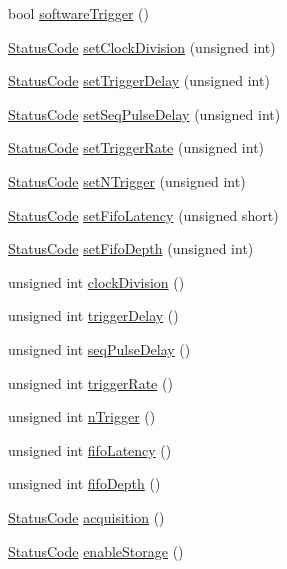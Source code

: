 \begin{DoxyCompactItemize}
\item 
bool \hyperlink{classA3PE_acb2ccd6b78b39a0a9e360439b3b6f4c7}{software\+Trigger} ()
\item 
\hyperlink{classStatusCode}{Status\+Code} \hyperlink{classA3PE_acf354b2c85a7e20f7f037beb278dd79d}{set\+Clock\+Division} (unsigned int)
\item 
\hyperlink{classStatusCode}{Status\+Code} \hyperlink{classA3PE_a6a63fc9503e0aa89ee9928fc7222ce0f}{set\+Trigger\+Delay} (unsigned int)
\item 
\hyperlink{classStatusCode}{Status\+Code} \hyperlink{classA3PE_af34831e9776a000f833a610ea999a564}{set\+Seq\+Pulse\+Delay} (unsigned int)
\item 
\hyperlink{classStatusCode}{Status\+Code} \hyperlink{classA3PE_a1ae8e5a69e17d6b3157779544fa14c75}{set\+Trigger\+Rate} (unsigned int)
\item 
\hyperlink{classStatusCode}{Status\+Code} \hyperlink{classA3PE_a81db44ddfc42b67ed08756b113b8e122}{set\+N\+Trigger} (unsigned int)
\item 
\hyperlink{classStatusCode}{Status\+Code} \hyperlink{classA3PE_a969469569005dfb130aca674de5dacff}{set\+Fifo\+Latency} (unsigned short)
\item 
\hyperlink{classStatusCode}{Status\+Code} \hyperlink{classA3PE_a4d8f78a1b09b409f288b34d503c71146}{set\+Fifo\+Depth} (unsigned int)
\item 
unsigned int \hyperlink{classA3PE_a81e32c82ca14f85fd7f26cd9a54f7a38}{clock\+Division} ()
\item 
unsigned int \hyperlink{classA3PE_ac0aabc1457923b7ee7da0a2c91c46451}{trigger\+Delay} ()
\item 
unsigned int \hyperlink{classA3PE_acce23c9abd4f434c8c5965351f5ceef0}{seq\+Pulse\+Delay} ()
\item 
unsigned int \hyperlink{classA3PE_ada46375753047d6a74acdec442044f39}{trigger\+Rate} ()
\item 
unsigned int \hyperlink{classA3PE_a3398fa3ce59a4b1b946e7b4ab4912580}{n\+Trigger} ()
\item 
unsigned int \hyperlink{classA3PE_a7f6959a6a38c16fa6609560827413764}{fifo\+Latency} ()
\item 
unsigned int \hyperlink{classA3PE_a8bb523e4a7a5dbb6ab3c5549ebf6db86}{fifo\+Depth} ()
\item 
\hyperlink{classStatusCode}{Status\+Code} \hyperlink{classA3PE_a035886b99761cc4f3c342ff0b4e44f59}{acquisition} ()
\item 
\hyperlink{classStatusCode}{Status\+Code} \hyperlink{classA3PE_a2071d7922f140ee6705da954efb685f7}{enable\+Storage} ()

\end{DoxyCompactItemize}

